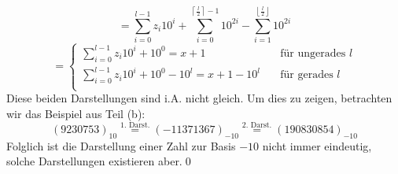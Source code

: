 \documentclass[a4paper, 11pt]{scrartcl}
\theoremstyle{dotless}
\newcommand{\floor}[1]{\left\lfloor #1\right\rfloor}
\newcommand{\ceil}[1]{\left\lceil #1\right\rceil}
\begin{document}
		$$=\sum_{i=0}^{l-1}z_i10^i + \sum_{i=0}^{\ceil{\frac{l}{2}}-1} 10^{2i} - 
		\sum_{i=1}^{\floor{\frac{l}{2}}} 10^{2i}$$
		$$=\left\{\begin{array}{ll}
		\sum_{i=0}^{l-1}z_i10^i+10^0=x+1\quad&\text{für ungerades }l\\
		\sum_{i=0}^{l-1}z_i10^i +10^0 - 10^l=x+1-10^l\quad&\text{für gerades }l\\
		\end{array}\right.
		$$
		Diese beiden Darstellungen sind i.A. nicht gleich. Um dies zu zeigen, betrachten wir das Beispiel aus Teil (b):
		$$(9230753)_{10}\overset{\text{1. Darst.}}{=}(-11371367)_{-10}\overset{\text{2. Darst.}}{=}(190830854)_{-10}$$
		Folglich ist die Darstellung einer Zahl zur Basis $-10$ nicht immer eindeutig, solche Darstellungen existieren aber.\qed
\end{document}
